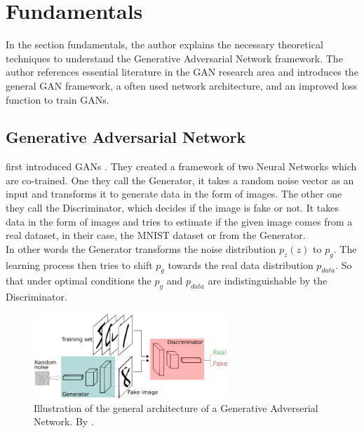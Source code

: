 \section{Fundamentals}

In the section fundamentals, the author explains the necessary theoretical techniques to understand the Generative Adversarial Network framework. The author references essential literature in the GAN research area and introduces the general GAN framework, a often used network architecture, and an improved loss function to train GANs.

\subsection{Generative Adversarial Network}

\citeauthor{goodfellow2014generative} first introduced GANs \cite{goodfellow2014generative}. They created a framework of two Neural Networks which are co-trained. One they call the Generator, it takes a random noise vector as an input and transforms it to generate data in the form of images. The other one they call the Discriminator, which decides if the image is fake or not. It takes data in the form of images and tries to estimate if the given image comes from a real dataset, in their case, the MNIST dataset or from the Generator.\\

In other words the Generator transforms the noise distribution $ p_{z}(z) $ to $ p_{g} $. The learning process then tries to shift $ p_{g} $ towards the real data distribution $ p_{data} $. So that under optimal conditions the $ p_{g} $ and $  p_{data} $ are indistinguishable by the Discriminator.\\

\begin{figure}[H]
    \centering
    \includegraphics[width=0.65\textwidth]{resources/images/gan.png}
    \caption{Illustration of the general architecture of a Generative Adverserial Network. By \citeauthor{twd:gan} \cite{twd:gan}.}
    \label{fig:gan}
\end{figure}

